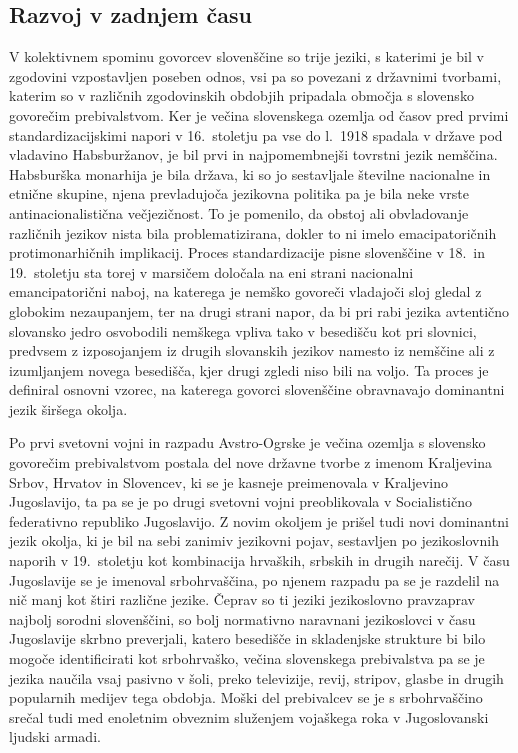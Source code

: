 \begin{multicols}{2}
\subsection{Razvoj v zadnjem času}

V kolektivnem spominu go\-vorcev slovenščine so trije jeziki, s katerimi je bil v zgodovini vzpostav\-ljen poseben odnos, vsi pa so povezani z državnimi tvorbami, katerim so v različnih zgodovinskih obdobjih pripadala območja s slovensko go\-vorečim prebivalstvom. Ker je večina slovenskega ozemlja od časov pred prvimi standardizacij\-skimi napori v 16.~stoletju pa vse do l.~1918 spadala v države pod vladavino Habs\-buržanov, je bil prvi in naj\-pomembnejši tovrstni jezik nemščina. Habs\-burška monarhija je bila država, ki so jo sestav\-ljale številne nacionalne in etnične skupine, njena prevladujoča jezikovna politika pa je bila neke vrste antinacionalistična večjezičnost. To je po\-menilo, da obstoj ali obvladovanje različnih jezikov nista bila problematizirana, dokler to ni imelo emacipatoričnih protimonarhičnih implikacij. Proces standardizacije pisne slovenščine v 18.~in 19.~stoletju sta torej v marsičem določala na eni strani nacionalni emancipatorični naboj, na katerega je nemško go\-voreči vladajoči sloj gledal z globokim nezaupanjem, ter na drugi strani napor, da bi pri rabi jezika avtentično slovansko jedro osvobodili nemškega vpliva tako v besedišču kot pri slovnici, predvsem z izposojanjem iz drugih slovanskih jezikov namesto iz nemščine ali z izumljanjem novega besedišča, kjer drugi zgledi niso bili na voljo. Ta proces je definiral osnovni vzorec, na katerega go\-vorci slovenščine obravnavajo dominantni jezik širšega okolja.


Po prvi svetovni vojni in razpadu Avstro-Ogrske je večina ozemlja s slovensko go\-vorečim prebivalstvom postala del nove državne tvorbe z imenom Kraljevina Srbov, Hrvatov in Slovencev, ki se je kasneje preimenovala v Kraljevino Jugoslavijo, ta pa se je po drugi svetovni vojni preoblikovala v Socialistično federativno republiko Jugoslavijo. Z novim okoljem je prišel tudi novi dominantni jezik okolja, ki je bil na sebi zanimiv jezikovni pojav, sestav\-ljen po jezikoslovnih naporih v 19.~stoletju kot kombinacija hrvaških, srbskih in drugih narečij. V času Jugoslavije se je imenoval srbohrvaščina, po njenem razpadu pa se je razdelil na nič manj kot štiri različne jezike. Čeprav so ti jeziki jezikoslovno pravzaprav naj\-bolj sorodni slovenščini, so bolj normativno naravnani jezikoslovci v času Jugoslavije skrbno preverjali, katero besedišče in skladenjske strukture bi bilo mogoče identificirati kot srbohrvaško, večina slovenskega prebivalstva pa se je jezika naučila vsaj pasivno v šoli, preko televizije, revij, stripov, glasbe in drugih popularnih medijev tega obdobja. Moški del prebivalcev se je s srbohrvaščino srečal tudi med enoletnim obveznim služenjem vojaškega roka v Jugoslovanski ljudski armadi.


\end{multicols}
